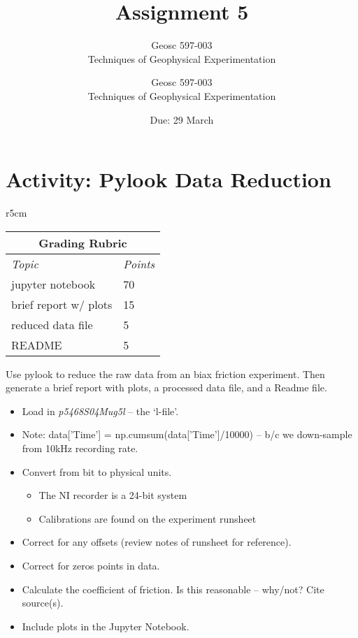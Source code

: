 \documentclass[10pt]{article}
\title{Assignment #1} %
\author{Geosc 597-003 \\
		Techniques of Geophysical Experimentation} %
\date{Due: #2}
\newcommand{\titler}[2]{
	\title{Assignment #1} %
	\author{Geosc 597-003 \\
		Techniques of Geophysical Experimentation} %
	\date{Due: #2}
	
	\maketitle}
\begin{document}

\titler{5}{29 March}

\section*{Activity: Pylook Data Reduction}

\begin{wraptable}{r}{5cm}
	\footnotesize
	\centering
	\begin{tabular}{@{}ll@{}}
		\multicolumn{2}{c}{\textbf{Grading Rubric}} \\ \midrule 
		\multicolumn{1}{l}{\textit{Topic}}   & \textit{Points}   \\ \midrule 
		jupyter notebook   & 70   \\ \midrule
		brief report w/ plots   & 15   \\ \midrule
		reduced data file & 5  \\ \midrule
		README & 5  \\ \bottomrule
	\end{tabular}
\end{wraptable}

Use pylook to reduce the raw data from an biax friction experiment. Then generate a brief report with plots, a processed data file, and a Readme file. 

\begin{itemize}
	\item Load in \textit{p5468S04Mug5l} -- the `l-file'.
	\item Note: data['Time'] = np.cumsum(data['Time']/10000) -- b/c we down-sample from 10kHz recording rate. 
	\item Convert from bit to physical units.
	\begin{itemize}
		\item The NI recorder is a 24-bit system
		\item Calibrations are found on the experiment runsheet
	\end{itemize}
	\item Correct for any offsets (review notes of runsheet for reference).
	\item Correct for zeros points in data. 
	\item Calculate the coefficient of friction. Is this reasonable -- why/not? Cite source(s).
	\item Include plots in the Jupyter Notebook.
\end{itemize}
\end{document}
